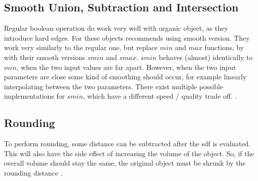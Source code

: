 \subsection{Smooth Union, Subtraction and Intersection}
Regular boolean operation do work very well with organic object, as they introduce hard edges. For these objects  \textcite{quilez:2008:distfunctions} recommends using smooth version. They work very similarly to the regular one, but replace $min$ and $max$ functions, by with their smooth versions $smin$ and $smax$. $smin$ behaves (almost) identically to $min$, when the two input values are far apart. However, when the two input parameters are close some kind of smoothing should occur, for example linearly interpolating between the two parameters. There exist multiple possible implementations for $smin$, which have a different speed / quality trade off. 
\cite{quilez:2008:distfunctions}\cite{quilez:2008:smoothmin}.

\subsection{Rounding}
To perform rounding, some distance can be subtracted after the \gls{sdf} is evaluated. This will also have the side effect of increasing the volume of the object. So, if the overall volume should stay the same, the original object must be shrunk by the rounding distance \cite{quilez:2008:distfunctions}.













